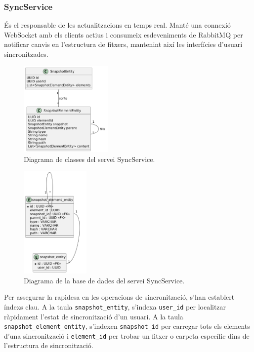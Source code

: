 \subsubsection{SyncService}
És el responsable de les actualitzacions en temps real. Manté una connexió WebSocket amb els clients actius i consumeix esdeveniments de RabbitMQ per notificar canvis en l'estructura de fitxers, mantenint així les interfícies d'usuari sincronitzades.

\begin{figure}[H]
    \centering
    \includegraphics[width=0.4\textwidth]{Figures/diagrama_clases_sync.png}
    \caption{Diagrama de classes del servei SyncService.}
    \label{fig:sync_classes}
\end{figure}

\begin{figure}[H]
    \centering
    \includegraphics[width=0.3\textwidth]{Figures/diagrama_bd_sync.png}
    \caption{Diagrama de la base de dades del servei SyncService.}
    \label{fig:sync_db}
\end{figure}

Per assegurar la rapidesa en les operacions de sincronització, s'han establert índexs clau. A la taula \texttt{snapshot\_entity}, s'indexa \texttt{user\_id} per localitzar ràpidament l'estat de sincronització d'un usuari. A la taula \texttt{snapshot\_element\_entity}, s'indexen \texttt{snapshot\_id} per carregar tots els elements d'una sincronització i \texttt{element\_id} per trobar un fitxer o carpeta específic dins de l'estructura de sincronització.

